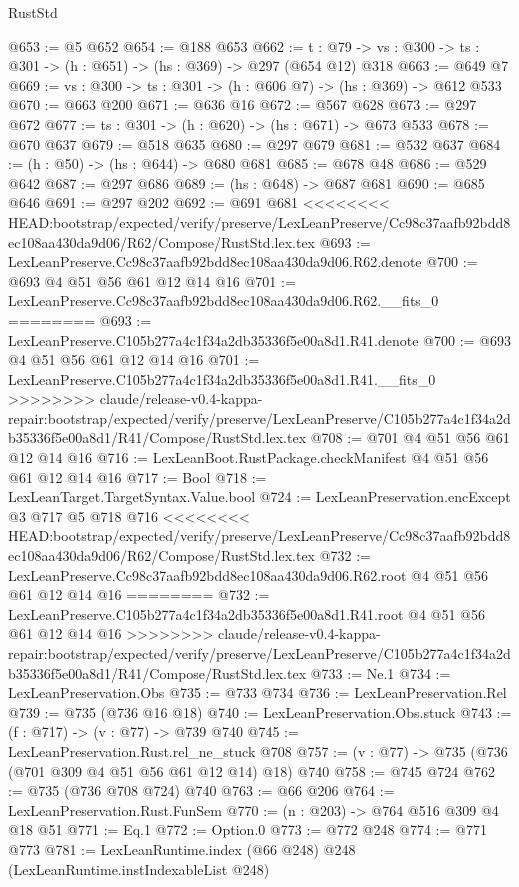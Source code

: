 \begin{lexlean}{RustStd}
\begin{coremodule}
{\begin{coremodule}
@653 := @5 @652
@654 := @188 @653
@662 := {t : @79} -> {vs : @300} -> {ts : @301} -> (h : @651) -> (hs : @369) -> @297 (@654 @12) @318
@663 := @649 @7
@669 := {vs : @300} -> {ts : @301} -> (h : @606 @7) -> (hs : @369) -> @612 @533
@670 := @663 @200
@671 := @636 @16
@672 := @567 @628
@673 := @297 @672
@677 := {ts : @301} -> (h : @620) -> (hs : @671) -> @673 @533
@678 := @670 @637
@679 := @518 @635
@680 := @297 @679
@681 := @532 @637
@684 := (h : @50) -> (hs : @644) -> @680 @681
@685 := @678 @48
@686 := @529 @642
@687 := @297 @686
@689 := (hs : @648) -> @687 @681
@690 := @685 @646
@691 := @297 @202
@692 := @691 @681
<<<<<<<< HEAD:bootstrap/expected/verify/preserve/LexLeanPreserve/Cc98c37aafb92bdd8ec108aa430da9d06/R62/Compose/RustStd.lex.tex
@693 := LexLeanPreserve.Cc98c37aafb92bdd8ec108aa430da9d06.R62.denote
@700 := @693 @4 @51 @56 @61 @12 @14 @16
@701 := LexLeanPreserve.Cc98c37aafb92bdd8ec108aa430da9d06.R62.__fits_0
========
@693 := LexLeanPreserve.C105b277a4c1f34a2db35336f5e00a8d1.R41.denote
@700 := @693 @4 @51 @56 @61 @12 @14 @16
@701 := LexLeanPreserve.C105b277a4c1f34a2db35336f5e00a8d1.R41.__fits_0
>>>>>>>> claude/release-v0.4-kappa-repair:bootstrap/expected/verify/preserve/LexLeanPreserve/C105b277a4c1f34a2db35336f5e00a8d1/R41/Compose/RustStd.lex.tex
@708 := @701 @4 @51 @56 @61 @12 @14 @16
@716 := LexLeanBoot.RustPackage.checkManifest @4 @51 @56 @61 @12 @14 @16
@717 := Bool
@718 := LexLeanTarget.TargetSyntax.Value.bool
@724 := LexLeanPreservation.encExcept @3 @717 @5 @718 @716
<<<<<<<< HEAD:bootstrap/expected/verify/preserve/LexLeanPreserve/Cc98c37aafb92bdd8ec108aa430da9d06/R62/Compose/RustStd.lex.tex
@732 := LexLeanPreserve.Cc98c37aafb92bdd8ec108aa430da9d06.R62.root @4 @51 @56 @61 @12 @14 @16
========
@732 := LexLeanPreserve.C105b277a4c1f34a2db35336f5e00a8d1.R41.root @4 @51 @56 @61 @12 @14 @16
>>>>>>>> claude/release-v0.4-kappa-repair:bootstrap/expected/verify/preserve/LexLeanPreserve/C105b277a4c1f34a2db35336f5e00a8d1/R41/Compose/RustStd.lex.tex
@733 := Ne.{1}
@734 := LexLeanPreservation.Obs
@735 := @733 @734
@736 := LexLeanPreservation.Rel
@739 := @735 (@736 @16 @18)
@740 := LexLeanPreservation.Obs.stuck
@743 := (f : @717) -> (v : @77) -> @739 @740
@745 := LexLeanPreservation.Rust.rel_ne_stuck @708
@757 := (v : @77) -> @735 (@736 (@701 @309 @4 @51 @56 @61 @12 @14) @18) @740
@758 := @745 @724
@762 := @735 (@736 @708 @724) @740
@763 := @66 @206
@764 := LexLeanPreservation.Rust.FunSem
@770 := (n : @203) -> @764 @516 @309 @4 @18 @51
@771 := Eq.{1}
@772 := Option.{0}
@773 := @772 @248
@774 := @771 @773
@781 := LexLeanRuntime.index (@66 @248) @248 (LexLeanRuntime.instIndexableList @248)

\end{coremodule}}
\end{coremodule}
\end{lexlean}
